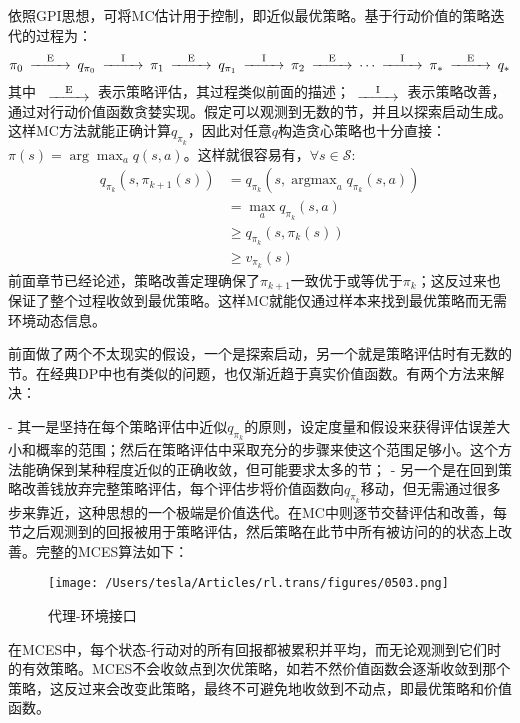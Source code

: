 \documentclass{ctexart}
\begin{document}
依照GPI思想，可将MC估计用于控制，即近似最优策略。基于行动价值的策略迭代的过程为：
\[\begin{CD}
\pi_0 @>\text E>> q_{\pi_0} @>\text I>> \pi_1 @>\text E>> q_{\pi_1} @>\text I>> \pi_2 @>\text E>> \cdots @>\text I>> \pi_* @>\text E>> q_*
\end{CD}\]
其中 $\begin{CD} @>\text E>> \end{CD}$表示策略评估，其过程类似前面的描述；$\begin{CD} @>\text I>> \end{CD}$表示策略改善，通过对行动价值函数贪婪实现。假定可以观测到无数的节，并且以探索启动生成。这样MC方法就能正确计算$q_{\pi_k}$，因此对任意$q$构造贪心策略也十分直接：$\pi(s) = \arg\max_aq(s,a)$。这样就很容易有，$\forall s \in \mathcal S$:
\begin{align*}
q_{\pi_k}(s, \pi_{k+1}(s))
&= q_{\pi_k}\left( s, \mathop{\text{argmax}}_a q_{\pi_k}(s,a) \right)\\
&= \max_a q_{\pi_k}(s,a)\\
&\ge q_{\pi_k}(s, \pi_k(s))\\
&\ge v_{\pi_k}(s)
\end{align*}
前面章节已经论述，策略改善定理确保了$\pi_{k+1}$一致优于或等优于$\pi_k$；这反过来也保证了整个过程收敛到最优策略。这样MC就能仅通过样本来找到最优策略而无需环境动态信息。

前面做了两个不太现实的假设，一个是探索启动，另一个就是策略评估时有无数的节。在经典DP中也有类似的问题，也仅渐近趋于真实价值函数。有两个方法来解决：

- 其一是坚持在每个策略评估中近似$q_{\pi_k}$的原则，设定度量和假设来获得评估误差大小和概率的范围；然后在策略评估中采取充分的步骤来使这个范围足够小。这个方法能确保到某种程度近似的正确收敛，但可能要求太多的节；
- 另一个是在回到策略改善钱放弃完整策略评估，每个评估步将价值函数向$q_{\pi_k}$移动，但无需通过很多步来靠近，这种思想的一个极端是价值迭代。在MC中则逐节交替评估和改善，每节之后观测到的回报被用于策略评估，然后策略在此节中所有被访问的的状态上改善。完整的MCES算法如下：

\begin{figure}[htbp]
    \centering
    \texttt{[image: /Users/tesla/Articles/rl.trans/figures/0503.png]}
    \caption{代理-环境接口}
    \label{fig:0503} 
\end{figure}

在MCES中，每个状态-行动对的所有回报都被累积并平均，而无论观测到它们时的有效策略。MCES不会收敛点到次优策略，如若不然价值函数会逐渐收敛到那个策略，这反过来会改变此策略，最终不可避免地收敛到不动点，即最优策略和价值函数。
\end{document}
